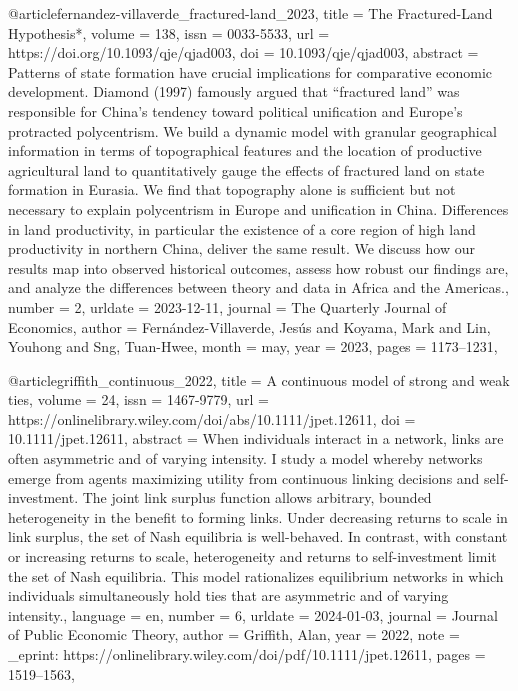 {{{@article{fernandez-villaverde_fractured-land_2023,
	title = {The {Fractured}-{Land} {Hypothesis}*},
	volume = {138},
	issn = {0033-5533},
	url = {https://doi.org/10.1093/qje/qjad003},
	doi = {10.1093/qje/qjad003},
	abstract = {Patterns of state formation have crucial implications for comparative economic development. Diamond (1997) famously argued that “fractured land” was responsible for China’s tendency toward political unification and Europe’s protracted polycentrism. We build a dynamic model with granular geographical information in terms of topographical features and the location of productive agricultural land to quantitatively gauge the effects of fractured land on state formation in Eurasia. We find that topography alone is sufficient but not necessary to explain polycentrism in Europe and unification in China. Differences in land productivity, in particular the existence of a core region of high land productivity in northern China, deliver the same result. We discuss how our results map into observed historical outcomes, assess how robust our findings are, and analyze the differences between theory and data in Africa and the Americas.},
	number = {2},
	urldate = {2023-12-11},
	journal = {The Quarterly Journal of Economics},
	author = {Fernández-Villaverde, Jesús and Koyama, Mark and Lin, Youhong and Sng, Tuan-Hwee},
	month = may,
	year = {2023},
	pages = {1173--1231},
}

@article{griffith_continuous_2022,
	title = {A continuous model of strong and weak ties},
	volume = {24},
	issn = {1467-9779},
	url = {https://onlinelibrary.wiley.com/doi/abs/10.1111/jpet.12611},
	doi = {10.1111/jpet.12611},
	abstract = {When individuals interact in a network, links are often asymmetric and of varying intensity. I study a model whereby networks emerge from agents maximizing utility from continuous linking decisions and self-investment. The joint link surplus function allows arbitrary, bounded heterogeneity in the benefit to forming links. Under decreasing returns to scale in link surplus, the set of Nash equilibria is well-behaved. In contrast, with constant or increasing returns to scale, heterogeneity and returns to self-investment limit the set of Nash equilibria. This model rationalizes equilibrium networks in which individuals simultaneously hold ties that are asymmetric and of varying intensity.},
	language = {en},
	number = {6},
	urldate = {2024-01-03},
	journal = {Journal of Public Economic Theory},
	author = {Griffith, Alan},
	year = {2022},
	note = {\_eprint: https://onlinelibrary.wiley.com/doi/pdf/10.1111/jpet.12611},
	pages = {1519--1563},
}

}}}
